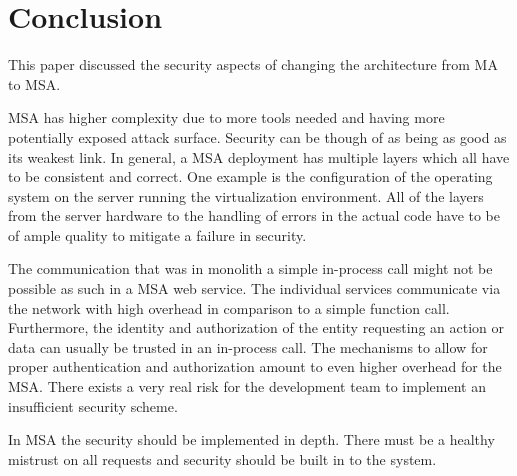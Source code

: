 \section{Conclusion}
\begin{sloppypar}
    This paper discussed the security aspects of changing the architecture from MA to MSA.
\end{sloppypar}
\begin{sloppypar}
    MSA has higher complexity due to more tools needed and having more 
    potentially exposed attack surface. Security can be though of as being as 
    good as its weakest link. In general, a MSA deployment has multiple layers 
    which all have to be consistent and correct. One example is the 
    configuration of the operating system on the server running the 
    virtualization environment. All of the layers from the server hardware to 
    the handling of errors in the actual code have to be of ample quality to 
    mitigate a failure in security.
\end{sloppypar}
\begin{sloppypar}
    The communication that was in monolith a simple in-process call might not be 
    possible as such in a MSA web service. The individual services communicate 
    via the network with high overhead in comparison to a simple function call. 
    Furthermore, the identity and authorization of the entity requesting an action 
    or data can usually be trusted in an in-process call. The mechanisms to 
    allow for proper authentication and authorization amount to even higher 
    overhead for the MSA. There exists a very real risk for the development 
    team to implement an insufficient security scheme.
\end{sloppypar}
\begin{sloppypar}
    In MSA the security should be implemented in depth. There must be a healthy 
    mistrust on all requests and security should be built in to the system.
\end{sloppypar}
